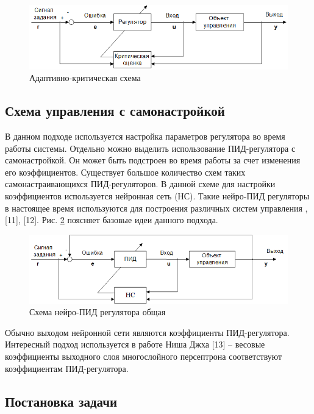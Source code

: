 \begin{figure}[H]
    \centering
    \includegraphics[width=\textwidth]{images/chapter1/Схема адаптивно-критическая.png}
    \caption{Адаптивно-критическая схема}
    \label{fig:adaptive_critic_control}
\end{figure}

\subsection{Схема управления с самонастройкой}

В данном подходе используется настройка параметров регулятора во время работы системы. Отдельно можно выделить использование ПИД-регулятора с самонастройкой. Он может быть подстроен во время работы за счет изменения его коэффициентов. Существует большое количество схем таких самонастраивающихся ПИД-регуляторов. В данной схеме для настройки коэффициентов  используется нейронная сеть (НС).
Такие нейро-ПИД регуляторы в настоящее время используются для построения различных систем управления \cite{Omatu_Khalid_Yusof}, [11], [12]. Рис. \ref{fig:neuro_PID_control} поясняет базовые идеи данного подхода.

\begin{figure}[H]
    \centering
    \includegraphics[width=\textwidth]{images/chapter1/Схема neuroPID общая.png}
    \caption{Схема нейро-ПИД регулятора общая}
    \label{fig:neuro_PID_control}
\end{figure}

Обычно выходом нейронной сети являются коэффициенты ПИД-регулятора. Интересный подход используется в работе Ниша Джха [13] – весовые коэффициенты выходного слоя многослойного персептрона соответствуют коэффициентам ПИД-регулятора.

\subsection{Постановка задачи}

